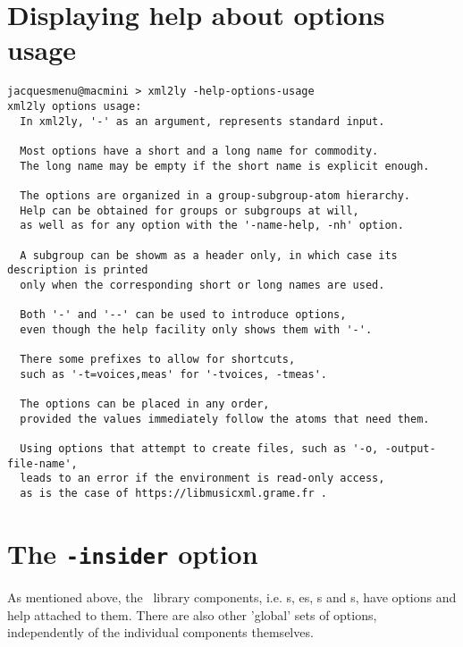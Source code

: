 \section{Displaying help about options usage}

\begin{lstlisting}[language=Terminal]
jacquesmenu@macmini > xml2ly -help-options-usage
xml2ly options usage:
  In xml2ly, '-' as an argument, represents standard input.

  Most options have a short and a long name for commodity.
  The long name may be empty if the short name is explicit enough.

  The options are organized in a group-subgroup-atom hierarchy.
  Help can be obtained for groups or subgroups at will,
  as well as for any option with the '-name-help, -nh' option.

  A subgroup can be showm as a header only, in which case its description is printed
  only when the corresponding short or long names are used.

  Both '-' and '--' can be used to introduce options,
  even though the help facility only shows them with '-'.

  There some prefixes to allow for shortcuts,
  such as '-t=voices,meas' for '-tvoices, -tmeas'.

  The options can be placed in any order,
  provided the values immediately follow the atoms that need them.

  Using options that attempt to create files, such as '-o, -output-file-name',
  leads to an error if the environment is read-only access,
  as is the case of https://libmusicxml.grame.fr .
\end{lstlisting}


\section{The {\tt -insider} option}

As mentioned above, the \mf\ library components, i.e. \representation s, \pass es, \converter s and \generator s, have options and help attached to them. There are also other 'global' sets of options, independently of the individual components themselves.

